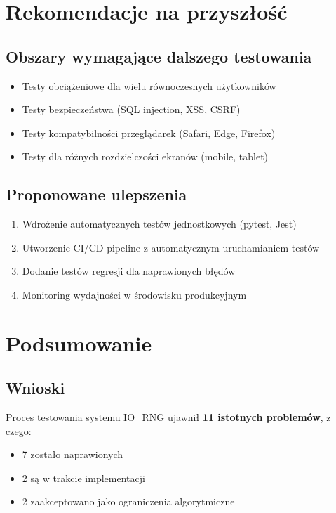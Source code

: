 \documentclass[12pt,a4paper]{article}
\begin{document}
\section{Rekomendacje na przyszłość}

\subsection{Obszary wymagające dalszego testowania}

\begin{itemize}
    \item Testy obciążeniowe dla wielu równoczesnych użytkowników
    \item Testy bezpieczeństwa (SQL injection, XSS, CSRF)
    \item Testy kompatybilności przeglądarek (Safari, Edge, Firefox)
    \item Testy dla różnych rozdzielczości ekranów (mobile, tablet)
\end{itemize}

\subsection{Proponowane ulepszenia}

\begin{enumerate}
    \item Wdrożenie automatycznych testów jednostkowych (pytest, Jest)
    \item Utworzenie CI/CD pipeline z automatycznym uruchamianiem testów
    \item Dodanie testów regresji dla naprawionych błędów
    \item Monitoring wydajności w środowisku produkcyjnym
\end{enumerate}

\section{Podsumowanie}

\subsection{Wnioski}

Proces testowania systemu IO\_RNG ujawnił \textbf{11 istotnych problemów}, z czego:
\begin{itemize}
    \item 7 zostało naprawionych
    \item 2 są w trakcie implementacji
    \item 2 zaakceptowano jako ograniczenia algorytmiczne
\end{itemize}
\end{document}
